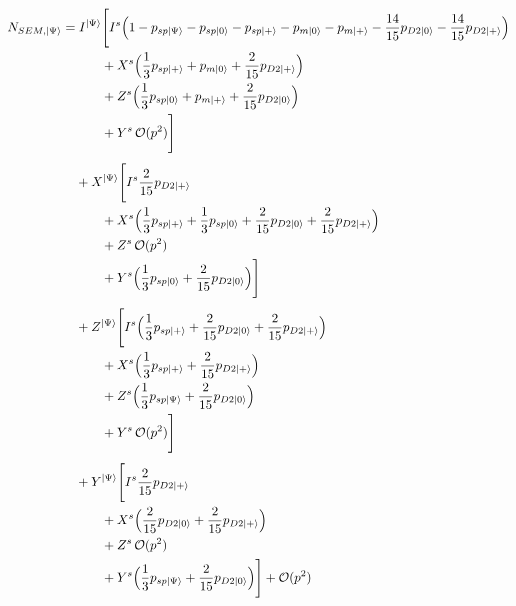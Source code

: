 \clearpage
\begin{align}
N_{SEM,\ket{\Psi}}=&\;
I^{\ket{\Psi}}
\Bigg[
{I}^{s}
\Big(
1
-p_{sp\ket{\Psi}}
-p_{sp\ket{0}}
-p_{sp\ket{+}}
-p_{m\ket{0}}
-p_{m\ket{+}}
-\frac{14}{15}p_{D2\ket{0}}
-\frac{14}{15}p_{D2\ket{+}}
\Big)
\nonumber\\
&\qquad
+X^{s}
\Big(
\frac13 p_{sp\ket{+}}
+p_{m\ket{0}}
+\frac{2}{15}p_{D2\ket{+}}
\Big)
\nonumber\\
&\qquad
+Z^{s}
\Big(
\frac13 p_{sp\ket{0}}
+p_{m\ket{+}}
+\frac{2}{15}p_{D2\ket{0}}
\Big)
\nonumber\\
&\qquad
+Y^{s}\,\mathcal{O}(p^2)
\Bigg]
\nonumber\\[1ex]
%
&+X^{\ket{\Psi}}
\Bigg[
I^{s}
\frac{2}{15}p_{D2\ket{+}}
\nonumber\\
&\qquad
+X^{s}
\Big(
\frac13 p_{sp\ket{+}}
+\frac13 p_{sp\ket{0}}
+\frac{2}{15}p_{D2\ket{0}}
+\frac{2}{15}p_{D2\ket{+}}
\Big)
\nonumber\\
&\qquad
+Z^{s}\,\mathcal{O}(p^2)
\nonumber\\
&\qquad
+Y^{s}
\Big(
\frac13 p_{sp\ket{0}}
+\frac{2}{15}p_{D2\ket{0}}
\Big)
\Bigg]
\nonumber\\[1ex]
%
&+Z^{\ket{\Psi}}
\Bigg[
I^{s}
\Big(
\frac13 p_{sp\ket{+}}
+\frac{2}{15}p_{D2\ket{0}}
+\frac{2}{15}p_{D2\ket{+}}
\Big)
\nonumber\\
&\qquad
+X^{s}
\Big(
\frac13 p_{sp\ket{+}}
+\frac{2}{15}p_{D2\ket{+}}
\Big)
\nonumber\\
&\qquad
+Z^{s}
\Big(
\frac13 p_{sp\ket{\Psi}}
+\frac{2}{15}p_{D2\ket{0}}
\Big)
\nonumber\\
&\qquad
+Y^{s}\,\mathcal{O}(p^2)
\Bigg]
\nonumber\\[1ex]
%
&+Y^{\ket{\Psi}}
\Bigg[
I^{s}
\frac{2}{15}p_{D2\ket{+}}
\nonumber\\
&\qquad
+X^{s}
\Big(
\frac{2}{15}p_{D2\ket{0}}
+\frac{2}{15}p_{D2\ket{+}}
\Big)
\nonumber\\
&\qquad
+Z^{s}\,\mathcal{O}(p^2)
\nonumber\\
&\qquad
+Y^{s}
\Big(
\frac13 p_{sp\ket{\Psi}}
+\frac{2}{15}p_{D2\ket{0}}
\Big)
\Bigg] + \mathcal{O}(p^2)
\label{eq:sem_data_qubit}
\end{align}



